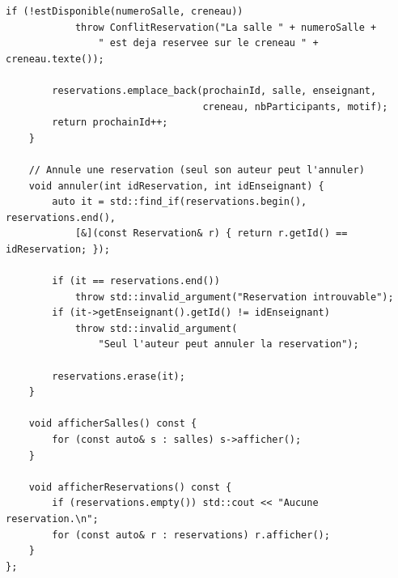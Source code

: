 \documentclass[12pt,a4paper]{report}
\begin{document}
\begin{lstlisting}[style=cppstyle]
        if (!estDisponible(numeroSalle, creneau))
            throw ConflitReservation("La salle " + numeroSalle +
                " est deja reservee sur le creneau " + creneau.texte());

        reservations.emplace_back(prochainId, salle, enseignant,
                                  creneau, nbParticipants, motif);
        return prochainId++;
    }

    // Annule une reservation (seul son auteur peut l'annuler)
    void annuler(int idReservation, int idEnseignant) {
        auto it = std::find_if(reservations.begin(), reservations.end(),
            [&](const Reservation& r) { return r.getId() == idReservation; });

        if (it == reservations.end())
            throw std::invalid_argument("Reservation introuvable");
        if (it->getEnseignant().getId() != idEnseignant)
            throw std::invalid_argument(
                "Seul l'auteur peut annuler la reservation");

        reservations.erase(it);
    }

    void afficherSalles() const {
        for (const auto& s : salles) s->afficher();
    }

    void afficherReservations() const {
        if (reservations.empty()) std::cout << "Aucune reservation.\n";
        for (const auto& r : reservations) r.afficher();
    }
};
\end{lstlisting}
\end{document}

